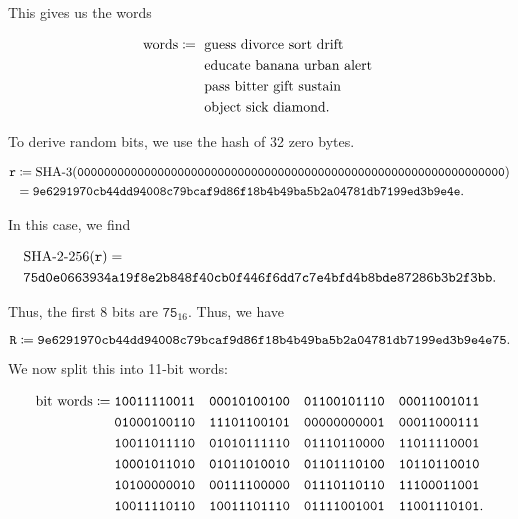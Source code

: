 \begin{example}
\noindent
This gives us the words

\begin{align}
    \text{words} \coloneqq{}
    &\text{ guess divorce sort drift } \nonumber\\
    &\text{ educate banana urban alert } \nonumber\\
    &\text{ pass bitter gift sustain } \nonumber\\
    &\text{ object sick diamond}.
\end{align}
\end{example}

\begin{example}

To derive random bits, we use the \ShaThree{} hash of 32 zero bytes.

\begin{align}
    \texttt{r} &\mathDef{} \text{\ShaThree{}}(
    \texttt{0000000000000000000000000000000000000000000000000000000000000000})
        \nonumber\\
    &=\texttt{9e6291970cb44dd94008c79bcaf9d86f18b4b49ba5b2a04781db7199ed3b9e4e}.
\end{align}

\noindent
In this case, we find

\begin{align}
    &\text{\ShaTwo{}-256}(\texttt{r}) = \nonumber\\
    &\texttt{75d0e0663934a19f8e2b848f40cb0f446f6dd7c7e4bfd4b8bde87286b3b2f3bb}.
\end{align}

\noindent
Thus, the first 8 bits are $\texttt{75}_{16}$.
Thus, we have

\begin{equation}
    \texttt{R} \coloneqq{}
    \texttt{9e6291970cb44dd94008c79bcaf9d86f18b4b49ba5b2a04781db7199ed3b9e4e75}.
\end{equation}

We now split this into 11-bit words:

\begin{align}
    \text{bit words} \coloneqq{}
    &\texttt{10011110011}\quad
    \texttt{00010100100}\quad
    \texttt{01100101110}\quad
    \texttt{00011001011} \nonumber\\
    &\texttt{01000100110}\quad
    \texttt{11101100101}\quad
    \texttt{00000000001}\quad
    \texttt{00011000111} \nonumber\\
    &\texttt{10011011110}\quad
    \texttt{01010111110}\quad
    \texttt{01110110000}\quad
    \texttt{11011110001} \nonumber\\
    &\texttt{10001011010}\quad
    \texttt{01011010010}\quad
    \texttt{01101110100}\quad
    \texttt{10110110010} \nonumber\\
    &\texttt{10100000010}\quad
    \texttt{00111100000}\quad
    \texttt{01110110110}\quad
    \texttt{11100011001} \nonumber\\
    &\texttt{10011110110}\quad
    \texttt{10011101110}\quad
    \texttt{01111001001}\quad
    \texttt{11001110101}.
\end{align}


\end{example}
